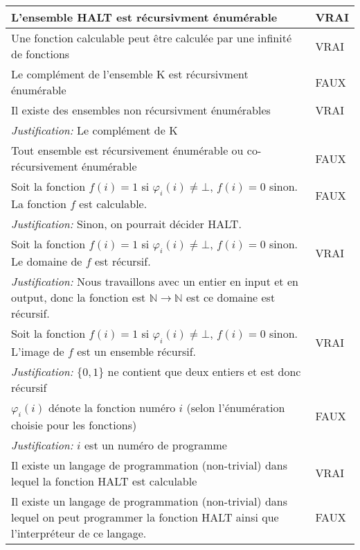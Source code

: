\begin{tabular}{p{13cm}|l}
    L'ensemble HALT est récursivment énumérable & VRAI \\
    \hline
    Une fonction calculable peut être calculée par une infinité de fonctions & VRAI \\
    \hline
    Le complément de l'ensemble K est récursivment énumérable & FAUX \\
    \hline
    Il existe des ensembles non récursivment énumérables & VRAI \\
    \textit{Justification:} Le complément de K & \\
    \hline
    Tout ensemble est récursivement énumérable ou co-récursivement énumérable & FAUX \\
    \hline
    Soit la fonction $f(i) = 1$ si $\varphi_{i}(i) \neq \bot$, $f(i) = 0$ sinon. La fonction $f$ est calculable. & FAUX \\
    \textit{Justification:} Sinon, on pourrait décider HALT. & \\
    \hline
    Soit la fonction $f(i) = 1$ si $\varphi_{i}(i) \neq \bot$, $f(i) = 0$ sinon. Le domaine de $f$ est récursif. & VRAI \\
    \textit{Justification:} Nous travaillons avec un entier en input et en output, donc la fonction est $\mathbb{N} \rightarrow \mathbb{N}$ est ce domaine est récursif. & \\
    \hline
    Soit la fonction $f(i) = 1$ si $\varphi_{i}(i) \neq \bot$, $f(i) = 0$ sinon. L'image de $f$ est un ensemble récursif. & VRAI \\
    \textit{Justification:} $\{0,1\}$ ne contient que deux entiers et est donc récursif &  \\
    \hline
    $\varphi_{i}(i)$ dénote la fonction numéro $i$ (selon l'énumération choisie pour les fonctions) & FAUX \\
    \textit{Justification:} $i$ est un numéro de programme & \\
    \hline
    Il existe un langage de programmation (non-trivial) dans lequel la fonction HALT est calculable & VRAI \\
    \hline
    Il existe un langage de programmation (non-trivial) dans lequel on peut programmer la fonction HALT ainsi que l'interpréteur de ce langage. & FAUX \\

\end{tabular}
